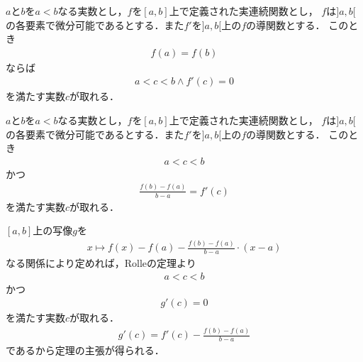 	\begin{screen}
		\begin{thm}[Rolleの定理]\label{Rolle_theorem}
			$a$と$b$を$a<b$なる実数とし，$f$を$[a,b]$上で定義された実連続関数とし，
			$f$は$]a,b[$の各要素で微分可能であるとする．また$f'$を$]a,b[$上の$f$の導関数とする．
			このとき
			\begin{align}
				f(a) = f(b)
			\end{align}
			ならば
			\begin{align}
				a < c < b \wedge f'(c) = 0
			\end{align}
			を満たす実数$c$が取れる．
		\end{thm}
	\end{screen}
	
	\begin{screen}
		\begin{thm}[平均値の定理]
		\label{mean_value_theorem_for_real_valued_differentiable_functions}
			$a$と$b$を$a<b$なる実数とし，$f$を$[a,b]$上で定義された実連続関数とし，
			$f$は$]a,b[$の各要素で微分可能であるとする．また$f'$を$]a,b[$上の$f$の導関数とする．
			このとき
			\begin{align}
				a < c < b
			\end{align}
			かつ
			\begin{align}
				\frac{f(b) - f(a)}{b - a} = f'(c)
			\end{align}
			を満たす実数$c$が取れる．
		\end{thm}
	\end{screen}
	
	\begin{sketch}
		$[a,b]$上の写像$g$を
		\begin{align}
			x \longmapsto f(x) - f(a) - \frac{f(b) - f(a)}{b - a} \cdot (x - a)
		\end{align}
		なる関係により定めれば，Rolleの定理より
		\begin{align}
			a < c < b
		\end{align}
		かつ
		\begin{align}
			g'(c) = 0
		\end{align}
		を満たす実数$c$が取れる．
		\begin{align}
			g'(c) = f'(c) - \frac{f(b) - f(a)}{b - a}
		\end{align}
		であるから定理の主張が得られる．
		\QED
	\end{sketch}